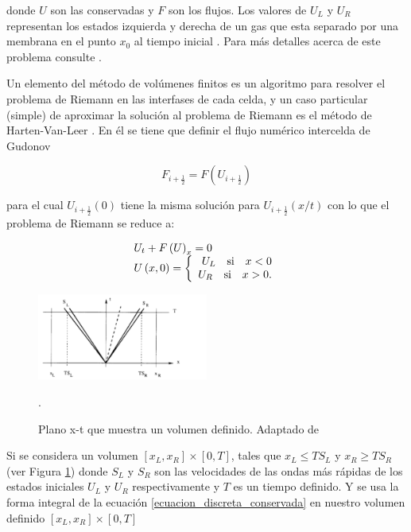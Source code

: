 \documentclass[12pt,a4paper]{book}
\begin{document}
\noindent donde $U$ son las conservadas y $F$ son los flujos. Los valores de $U_{L}$ y $U_{R}$ representan los estados izquierda y derecha de un gas que esta separado por una membrana en el punto $x_0$ al tiempo 
inicial \citep{Lora2013}.
Para más detalles acerca de este problema consulte \citet{Toro1997}.



	Un elemento del método de volúmenes finitos es un algoritmo para resolver el problema de Riemann en las interfases de cada celda, y un caso particular (simple) de aproximar la solución al 
  problema de Riemann es el método de Harten-Van-Leer \citep{Toro1997}. En él se tiene que definir el flujo numérico intercelda de Gudonov

\begin{equation}
F_{i+\frac{1}{2}}=F \left( U_{i+\frac{1}{2}} \right)
\end{equation}

\noindent para el cual $U_{i+\frac{1}{2}}(0)$ tiene la misma solución para $U_{i+\frac{1}{2}}(x/t)$ con lo que el problema de Riemann se reduce a:

\begin{equation} \label{ecuacion_discreta_conservada}
\begin{array}{ll}
U_t + F \left( U \right)_x = 0 \\
U \left(x,0 \right) = 
\left\lbrace
\begin{array}{rr}
U_L \quad \textup{si} \quad x<0  \\
U_R \quad \textup{si} \quad x>0.
\end{array}
\right.
\end{array}
\end{equation}

\begin{figure} %
  \centering
    \includegraphics[width=0.5\textwidth]{Figuras/capitulo_2/HLL_onda.png}
  \caption{Plano x-t que muestra un volumen definido. Adaptado de \citet{Toro1997}}.
  \label{fig:Plano x_t}
\end{figure}

\noindent Si se considera un volumen $\left[x_L, x_R \right]\times \left[ 0 , T \right]$, tales que $x_L \leq TS_L$ y $x_R \geq TS_R$ (ver Figura \ref{fig:Plano x_t}) donde $S_L$ y $S_R$ son las velocidades de las ondas más 
rápidas de los estados iniciales $U_L$ y $U_R$ respectivamente y $T$ es un tiempo definido. Y se usa la forma integral de la 
ecuación   \ref{ecuacion_discreta_conservada} en nuestro volumen definido $\left[x_L, x_R \right]\times \left[ 0 , T \right]$
\end{document}
